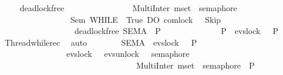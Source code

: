 \begin{isabellebody}
\ \ \isamarkupfalse%
\ {\isacartoucheopen}{\isasymnot}\ deadlock{\isacharunderscore}{\kern0pt}free\isanewline
\ \ \ \ \ \ \ \ \ \ \ \ \ \ \ {\isacharparenleft}{\kern0pt}\ MultiInter\ {\isacharparenleft}{\kern0pt}mset\ {\isacharbrackleft}{\kern0pt}{}{\isachardot}{\kern0pt}{\isachardot}{\kern0pt}{}{\isacharbrackright}{\kern0pt}{\isacharparenright}{\kern0pt}\ semaphore\isanewline
\ \ \ \ \ \ \ \ \ \ \ \ \ \ \ \ {\isacharbar}{\kern0pt}{\isacharbar}{\kern0pt}\ Sem\ {\isacharparenleft}{\kern0pt}WHILE\ {\isasymlambda}{\isasymsigma}{\isachardot}{\kern0pt}\ True\ DO\ com{\isachardot}{\kern0pt}lock\ {}{\isacharparenright}{\kern0pt}\ {\isacharparenleft}{\kern0pt}{\isasymlambda}{\isacharunderscore}{\kern0pt}{\isachardot}{\kern0pt}\ Skip{\isacharparenright}{\kern0pt}\ {\isasymsigma}\isanewline
\ \ \ \ \ \ \ \ \ \ \ \ \ \ \ \ {\isacharparenleft}{\kern0pt}\ {\isacartoucheopen}{\isasymnot}\ deadlock{\isacharunderscore}{\kern0pt}free\ {\isacharparenleft}{\kern0pt}{\isacharquery}{\kern0pt}SEMA\ {\isacharbar}{\kern0pt}{\isacharbar}{\kern0pt}\ {\isacharquery}{\kern0pt}P\ {\isacharparenright}{\kern0pt}{\isacartoucheclose}{\isacharparenright}{\kern0pt}\isanewline
\ \ \isamarkupfalse%
\ {\isacharminus}{\kern0pt}\ \isanewline
\ \ \ \ \isamarkupfalse%
\ {}\ {\isacharcolon}{\kern0pt}\ {\isacartoucheopen}{\isacharquery}{\kern0pt}P\ {\isacharequal}{\kern0pt}\ evs{\isachardot}{\kern0pt}lock\ {}\ {\isasymrightarrow}\ {\isacharquery}{\kern0pt}P{\isacartoucheclose}\ \isamarkupfalse%
\ Thread{}{\isacharunderscore}{\kern0pt}while{\isacharunderscore}{\kern0pt}rec\ \isamarkupfalse%
\ auto\isanewline
\ \ \ \ \isamarkupfalse%
\ {}\ {\isacharcolon}{\kern0pt}\ {\isacartoucheopen}{\isacharparenleft}{\kern0pt}{\isacharquery}{\kern0pt}SEMA\ {\isacharbar}{\kern0pt}{\isacharbar}{\kern0pt}\ evs{\isachardot}{\kern0pt}lock\ {}\ {\isasymrightarrow}\ {\isacharquery}{\kern0pt}P{\isacharparenright}{\kern0pt}\ \isanewline
\ \ \ \ \ \ \ \ \ \ \ \ \ \ {\isacharequal}{\kern0pt}\ \ evs{\isachardot}{\kern0pt}lock\ {}\ {\isasymrightarrow}\ {\isacharparenleft}{\kern0pt}{\isacharparenleft}{\kern0pt}evs{\isachardot}{\kern0pt}unlock\ {}\ {\isasymrightarrow}\ semaphore\ {}\ \ \isanewline
\ \ \ \ \ \ \ \ \ \ \ \ \ \ \ \ \ \ \ \ \ \ \ \ \ \ \ \ \ \ \ \ {\isacharbar}{\kern0pt}{\isacharbar}{\kern0pt}{\isacharbar}{\kern0pt}\ MultiInter\ {\isacharparenleft}{\kern0pt}mset\ {\isacharbrackleft}{\kern0pt}{}{\isachardot}{\kern0pt}{\isachardot}{\kern0pt}{}{\isacharbrackright}{\kern0pt}{\isacharparenright}{\kern0pt}\ semaphore{\isacharparenright}{\kern0pt}\ {\isacharbar}{\kern0pt}{\isacharbar}{\kern0pt}\ {\isacharquery}{\kern0pt}P{\isacharparenright}{\kern0pt}{\isacartoucheclose}\isanewline

\end{isabellebody}
